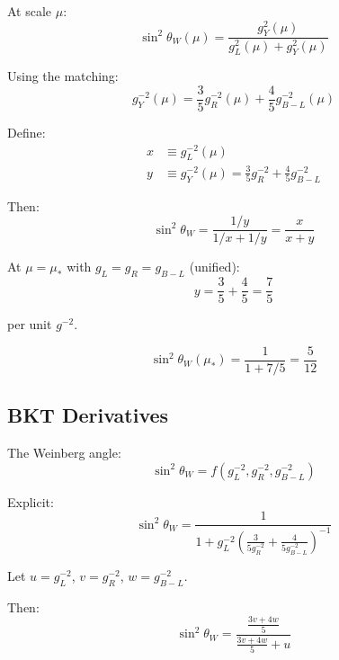 \documentclass[11pt,a4paper]{article}
\begin{document}
At scale $\mu$:
\begin{equation}
\label{eq:sin2-general-mu}
\sin^2\theta_W(\mu) = \frac{g_Y^2(\mu)}{g_L^2(\mu) + g_Y^2(\mu)}
\end{equation}

Using the matching:
\begin{equation}
\label{eq:gY-from-matching}
g_Y^{-2}(\mu) = \frac{3}{5}g_R^{-2}(\mu) + \frac{4}{5}g_{B-L}^{-2}(\mu)
\end{equation}

Define:
\begin{align}
\label{eq:x-def}
x &\equiv g_L^{-2}(\mu) \\
\label{eq:y-def}
y &\equiv g_Y^{-2}(\mu) = \frac{3}{5}g_R^{-2} + \frac{4}{5}g_{B-L}^{-2}
\end{align}

Then:
\begin{equation}
\label{eq:sin2-xy}
\sin^2\theta_W = \frac{1/y}{1/x + 1/y} = \frac{x}{x+y}
\end{equation}

At $\mu = \mu_*$ with $g_L = g_R = g_{B-L}$ (unified):
\begin{equation}
\label{eq:unified-y}
y = \frac{3}{5} + \frac{4}{5} = \frac{7}{5}
\end{equation}

per unit $g^{-2}$.

\begin{equation}
\label{eq:sin2-unified-calc}
\sin^2\theta_W(\mu_*) = \frac{1}{1 + 7/5} = \frac{5}{12}
\end{equation}

\subsection{BKT Derivatives}
\label{subsec:bkt-derivatives}

The Weinberg angle:
\begin{equation}
\label{eq:sin2-function}
\sin^2\theta_W = f(g_L^{-2}, g_R^{-2}, g_{B-L}^{-2})
\end{equation}

Explicit:
\begin{equation}
\label{eq:sin2-explicit-func}
\sin^2\theta_W = \frac{1}{1 + g_L^{-2}\left(\frac{3}{5g_R^{-2}} + \frac{4}{5g_{B-L}^{-2}}\right)^{-1}}
\end{equation}

Let $u = g_L^{-2}$, $v = g_R^{-2}$, $w = g_{B-L}^{-2}$.

Then:
\begin{equation}
\label{eq:sin2-uvw}
\sin^2\theta_W = \frac{\frac{3v + 4w}{5}}{\frac{3v + 4w}{5} + u}
\end{equation}
\end{document}
